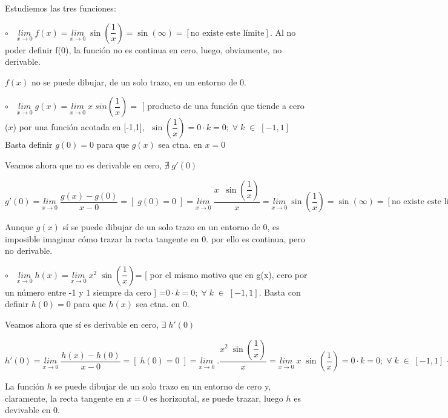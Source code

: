 	\begin{proofw}\renewcommand{\qedsymbol}{$\diamond$}	
	
	Estudiemos las tres funciones:
	
	$\circ \quad \underset {x\to 0}{lim}\;{f(x)}=\underset {x\to 0}{lim}\;{\sin \left( \dfrac 1 x \right)}=\sin (\infty)=[ \mbox{no existe este límite}]$. Al no poder definir f(0), la función no es continua en cero, luego, obviamente, no derivable.
	
	$f(x)$ no se puede dibujar, de un solo trazo, en un entorno de $0$.
	
	$\circ \quad \underset {x\to 0}{lim}\;{g(x)}=\underset {x\to 0}{lim}\;{x\; sin \left( \dfrac 1 x \right)}= $ [ producto de una función que tiende a cero ($x$) por una función acotada en [-1,1], $\; \sin \left( \dfrac 1 x \right) = 0\cdot k=0; \; \forall\; k\; \in \; [-1,1]$ Basta definir $g(0)=0$ para que $g(x)$ sea ctna. en $x=0$
	
	Veamos ahora que no es derivable en cero, $\nexists \; g'(0)$
	
	$g'(0)=\underset {x \to 0}{lim }\;{\dfrac {g(x)-g(0)}{x-0}}=[\; g(0)=0 \; ]=\underset {x \to 0}{lim}\;{ \dfrac {x\; \; \sin \left( \dfrac 1 x \right)}{x}} = \underset {x\to 0}{lim}\:{\sin \left( \dfrac 1 x \right)}=\sin (\infty)=[ \mbox{no existe este límite}] \to \nexists \; g'(0)$
	
	Aunque $g(x)$ sí se puede dibujar de un solo trazo en un entorno de $0$, es imposible imaginar cómo trazar la recta tangente en $0$. por ello es continua, pero no derivable.
	
	$\circ \quad \underset {x\to 0}{lim}\;{h(x)=}\underset {x \to 0}{lim}\; { x^2\; \sin \left( \dfrac 1 x \right) }$= [ por el mismo motivo que en g(x), cero por un número entre -1 y 1 siempre da cero ] =$0\cdot k=0; \; \forall\; k\; \in \; [-1,1]$. Basta con definir $h(0)=0$ para que $h(x)$ sea ctna. en $0$.
	
	Veamos ahora que sí es derivable en cero, $\exists \; h'(0)$ 
	
	$h'(0)= \underset {x\to 0}{lim }\; { \dfrac {h(x)-h(0)} {x-0}}=[\; h(0)=0 \; ] = \underset {x\to 0}{lim }\; {.\dfrac { x^2\; \sin \left( \dfrac 1 x \right) }{x} = \underset {x\to 0}{lim}\; {x\; \sin \left( \dfrac 1 x \right)}}=0\cdot k=0; \; \forall\; k\; \in \; [-1,1] \to \exists \; h'(0)=0$
	
	La función $h$ se puede dibujar de un solo trazo en un entorno de cero y, claramente, la recta tangente en $x=0$ es horizontal, se puede trazar, luego $h$ es devivable en $0$.
		

\end{proofw}
